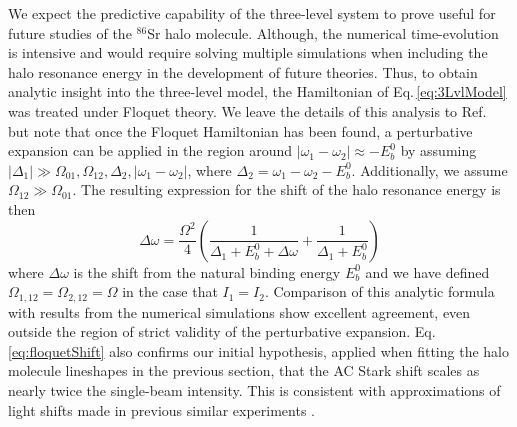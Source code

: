 We expect the predictive capability of the three-level system to prove useful for future studies of the $^{86}$Sr halo molecule.
Although, the numerical time-evolution is intensive and would require solving multiple simulations when including the halo resonance energy in the development of future theories.
Thus, to obtain analytic insight into the three-level model, the Hamiltonian of Eq.\,\ref{eq:3LvlModel} was treated under Floquet theory.
We leave the details of this analysis to Ref.\,\cite{Kon2018} but note that once the Floquet Hamiltonian has been found, a perturbative expansion can be applied in the region around $|\omega_1 - \omega_2| \approx -E_b^0$ by assuming $|\Delta_1| \gg \Omega_{01}, \Omega_{12}, \Delta_2, |\omega_1 - \omega_2|$, where $\Delta_2 = \omega_1 - \omega_2 - E_b^0$.
Additionally, we assume $\Omega_{12} \gg \Omega_{01}$.
The resulting expression for the shift of the halo resonance energy is then
\begin{equation} \label{eq:floquetShift}
	\Delta \omega = \frac{\Omega^2}{4} \left( \frac{1}{\Delta_1 + E_b^0 + \Delta\omega} + \frac{1}{\Delta_1 + E_b^0} \right)
\end{equation}
where $\Delta\omega$ is the shift from the natural binding energy $E_b^0$ and we have defined $\Omega_{1,12}=\Omega_{2,12}=\Omega$ in the case that $I_1=I_2$.
Comparison of this analytic formula with results from the numerical simulations show excellent agreement, even outside the region of strict validity of the perturbative expansion.
Eq.\,\ref{eq:floquetShift} also confirms our initial hypothesis, applied when fitting the halo molecule lineshapes in the previous section, that the AC Stark shift scales as nearly twice the single-beam intensity.
This is consistent with approximations of light shifts made in previous similar experiments \cite{Wynar2000,Tojo2006}.

